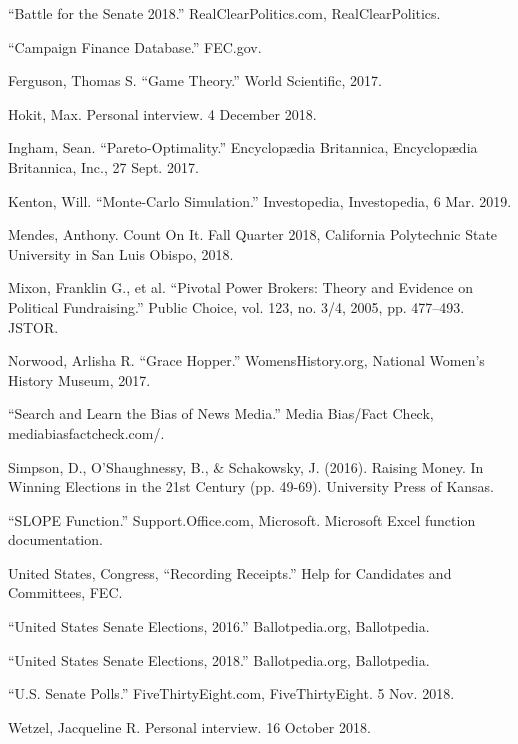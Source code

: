 \documentclass[11pt]{article}
\begin{document}
\newpage
\begin{flushleft}
\begin{thebibliography}{9}
\begin{small}
``Battle for the Senate 2018.'' RealClearPolitics.com, RealClearPolitics.
\bigskip

``Campaign Finance Database.'' FEC.gov.
\bigskip

Ferguson, Thomas S. ``Game Theory.'' World Scientific, 2017.
\bigskip

Hokit, Max. Personal interview. 4 December 2018.
\bigskip

Ingham, Sean. ``Pareto-Optimality.'' Encyclop{\ae}dia Britannica, Encyclop{\ae}dia Britannica, Inc., 27 Sept. 2017.
\bigskip

Kenton, Will. ``Monte-Carlo Simulation.'' Investopedia, Investopedia, 6 Mar. 2019.
\bigskip

Mendes, Anthony. Count On It. Fall Quarter 2018, California Polytechnic State University in San Luis Obispo, 2018.
\bigskip

Mixon, Franklin G., et al. ``Pivotal Power Brokers: Theory and Evidence on Political Fundraising.'' Public Choice, vol. 123, no. 3/4, 2005, pp. 477–493. JSTOR.
\bigskip

Norwood, Arlisha R. ``Grace Hopper.'' WomensHistory.org, National Women's History Museum, 2017.
\bigskip

``Search and Learn the Bias of News Media.'' Media Bias/Fact Check, mediabiasfactcheck.com/.
\bigskip

Simpson, D., O'Shaughnessy, B., \& Schakowsky, J. (2016). Raising Money. In Winning Elections in the 21st Century (pp. 49-69). University Press of Kansas.
\bigskip

``SLOPE Function.'' Support.Office.com, Microsoft. Microsoft Excel function documentation.
\bigskip

United States, Congress, ``Recording Receipts.'' Help for Candidates and Committees, FEC.
\bigskip

``United States Senate Elections, 2016.'' Ballotpedia.org, Ballotpedia.
\bigskip

``United States Senate Elections, 2018.'' Ballotpedia.org, Ballotpedia.
\bigskip

``U.S. Senate Polls.'' FiveThirtyEight.com, FiveThirtyEight. 5 Nov. 2018.
\bigskip

Wetzel, Jacqueline R. Personal interview. 16 October 2018.
\bigskip

\end{small}

\end{thebibliography}

\end{flushleft}
\noindent
\end{document}
